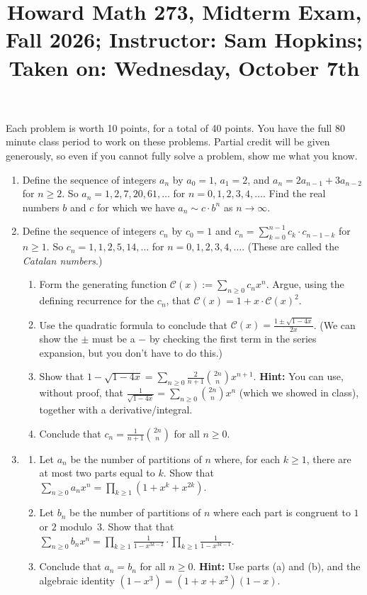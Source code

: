 \documentclass[11pt]{article}
\title{Howard Math 273, Midterm Exam, \\ {\normalsize Fall 2026; Instructor: Sam Hopkins; Taken on: Wednesday, October 7th}}
\date{}
\begin{document}
\maketitle

\thispagestyle{empty}

\vspace{-1.8cm}

Each problem is worth 10 points, for a total of 40 points. You have the full 80 minute class period to work on these problems. Partial credit will be given generously, so even if you cannot fully solve a problem, show me what you know.

\begin{enumerate}

\item Define the sequence of integers $a_n$ by $a_0 = 1$, $a_1 = 2$, and $a_n = 2 a_{n-1} + 3 a_{n-2}$ for $n \geq 2$. So $a_n = 1,2,7,20,61,\ldots$ for $n=0,1,2,3,4,\ldots$. Find the real numbers $b$ and $c$ for which we have $a_n \sim c \cdot b^n$ as $n \to \infty$.

\item Define the sequence of integers $c_n$ by $c_0=1$ and $c_n = \sum_{k=0}^{n-1} c_k \cdot c_{n-1-k}$ for $n \geq 1$. So $c_n = 1,1,2,5,14,\ldots$ for $n=0,1,2,3,4,\ldots$. (These are called the \emph{Catalan numbers}.)
\begin{enumerate}
\item Form the generating function $\mathcal{C}(x) := \sum_{n \geq0} c_n x^n$. Argue, using the defining recurrence for the $c_n$, that $\mathcal{C}(x) = 1+ x\cdot \mathcal{C}(x)^2$.
\item Use the quadratic formula to conclude that $\mathcal{C}(x) = \frac{1\pm \sqrt{1-4x}}{2x}$. (We can show the $\pm$ must be a $-$ by checking the first term in the series expansion, but you don't have to do this.)
\item Show that $1-\sqrt{1-4x}=\sum_{n \geq 0} \frac{2}{n+1}\binom{2n}{n} x^{n+1}$. {\bf Hint:} You can use, without proof, that $\frac{1}{\sqrt{1-4x}} = \sum_{n \geq 0}\binom{2n}{n}x^n$ (which we showed in class), together with a derivative/integral.
\item Conclude that $c_n = \frac{1}{n+1}\binom{2n}{n}$ for all $n \geq 0$.
\end{enumerate}

\item \begin{enumerate}
\item Let $a_n$ be the number of partitions of $n$ where, for each $k \geq 1$, there are at most two parts equal to $k$. Show that $\sum_{n \geq 0} a_n x^n = \prod_{k \geq 1} (1+x^{k}+x^{2k})$.
\item Let $b_n$ be the number of partitions of $n$ where each part is congruent to $1$ or $2$ modulo~$3$. Show that that $\sum_{n \geq 0} b_n x^n = \prod_{k \geq 1} \frac{1}{1-x^{3k-2}} \cdot \prod_{k \geq 1} \frac{1}{1-x^{3k-1}}$.
\item Conclude that $a_n = b_n$ for all $n \geq 0$. {\bf Hint:} Use parts (a) and (b), and the algebraic identity $(1-x^3) = (1+x+x^2)(1-x)$.
\end{enumerate}


\end{enumerate}
\end{document}
